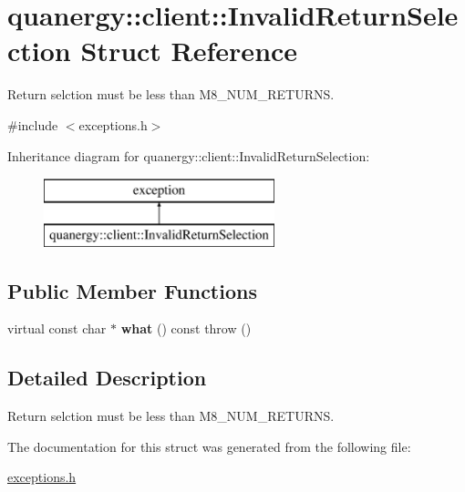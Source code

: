 \hypertarget{structquanergy_1_1client_1_1InvalidReturnSelection}{\section{quanergy\-:\-:client\-:\-:Invalid\-Return\-Selection Struct Reference}
\label{structquanergy_1_1client_1_1InvalidReturnSelection}
}


Return selction must be less than M8\-\_\-\-N\-U\-M\-\_\-\-R\-E\-T\-U\-R\-N\-S.  




{\ttfamily \#include $<$exceptions.\-h$>$}

Inheritance diagram for quanergy\-:\-:client\-:\-:Invalid\-Return\-Selection\-:\begin{figure}[H]
\begin{center}
\leavevmode
\includegraphics[height=2.000000cm]{structquanergy_1_1client_1_1InvalidReturnSelection}
\end{center}
\end{figure}
\subsection*{Public Member Functions}
\begin{DoxyCompactItemize}
\item 
\hypertarget{structquanergy_1_1client_1_1InvalidReturnSelection_a7e00dadd733995353275c23db2805829}{virtual const char $\ast$ {\bfseries what} () const   throw ()}\label{structquanergy_1_1client_1_1InvalidReturnSelection_a7e00dadd733995353275c23db2805829}

\end{DoxyCompactItemize}


\subsection{Detailed Description}
Return selction must be less than M8\-\_\-\-N\-U\-M\-\_\-\-R\-E\-T\-U\-R\-N\-S. 

The documentation for this struct was generated from the following file\-:\begin{DoxyCompactItemize}
\item 
\hyperlink{exceptions_8h}{exceptions.\-h}\end{DoxyCompactItemize}
